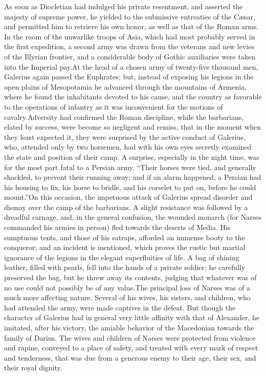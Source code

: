 As soon as Diocletian had indulged his private resentment, and
asserted the majesty of supreme power, he yielded to the
submissive entreaties of the Cæsar, and permitted him to retrieve
his own honor, as well as that of the Roman arms. In the room of
the unwarlike troops of Asia, which had most probably served in
the first expedition, a second army was drawn from the veterans
and new levies of the Illyrian frontier, and a considerable body
of Gothic auxiliaries were taken into the Imperial pay.\footnotemark[69] At the
head of a chosen army of twenty-five thousand men, Galerius again
passed the Euphrates; but, instead of exposing his legions in the
open plains of Mesopotamia he advanced through the mountains of
Armenia, where he found the inhabitants devoted to his cause, and
the country as favorable to the operations of infantry as it was
inconvenient for the motions of cavalry.\footnotemark[70] Adversity had
confirmed the Roman discipline, while the barbarians, elated by
success, were become so negligent and remiss, that in the moment
when they least expected it, they were surprised by the active
conduct of Galerius, who, attended only by two horsemen, had with
his own eyes secretly examined the state and position of their
camp. A surprise, especially in the night time, was for the most
part fatal to a Persian army. “Their horses were tied, and
generally shackled, to prevent their running away; and if an
alarm happened, a Persian had his housing to fix, his horse to
bridle, and his corselet to put on, before he could mount.”\footnotemark[71] On
this occasion, the impetuous attack of Galerius spread disorder
and dismay over the camp of the barbarians. A slight resistance
was followed by a dreadful carnage, and, in the general
confusion, the wounded monarch (for Narses commanded his armies
in person) fled towards the deserts of Media. His sumptuous
tents, and those of his satraps, afforded an immense booty to the
conqueror; and an incident is mentioned, which proves the rustic
but martial ignorance of the legions in the elegant superfluities
of life. A bag of shining leather, filled with pearls, fell into
the hands of a private soldier; he carefully preserved the bag,
but he threw away its contents, judging that whatever was of no
use could not possibly be of any value.\footnotemark[72] The principal loss of
Narses was of a much more affecting nature. Several of his wives,
his sisters, and children, who had attended the army, were made
captives in the defeat. But though the character of Galerius had
in general very little affinity with that of Alexander, he
imitated, after his victory, the amiable behavior of the
Macedonian towards the family of Darius. The wives and children
of Narses were protected from violence and rapine, conveyed to a
place of safety, and treated with every mark of respect and
tenderness, that was due from a generous enemy to their age,
their sex, and their royal dignity.\footnotemark[73]

